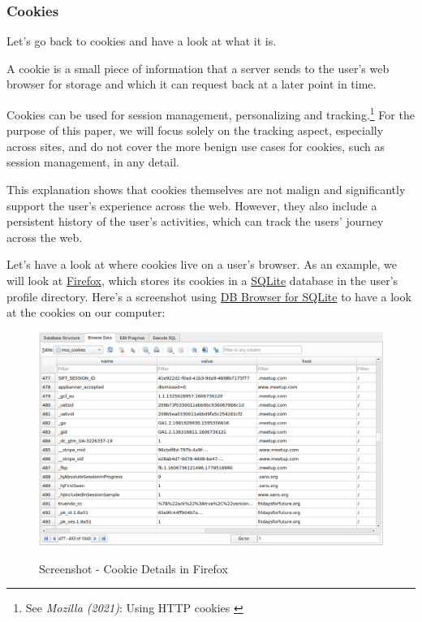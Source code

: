 \subsubsection{Cookies}

Let's go back to cookies and have a look at what it is.

A cookie is a small piece of information that a server sends to the user's web browser for storage and which it can request back at a later point in time.

Cookies can be used for session management, personalizing and tracking.\footnote{See \textit{Mozilla (2021)}: Using HTTP cookies \cite{usingCookies}} For the purpose of this paper, we will focus solely on the tracking aspect, especially across sites, and do not cover the more benign use cases for cookies, such as session management, in any detail.

This explanation shows that cookies themselves are not malign and significantly support the user's experience across the web. However, they also include a persistent history of the user's activities, which can track the users' journey across the web.

Let's have a look at where cookies live on a user's browser. As an example, we will look at \href{https://www.mozilla.org/en-US/firefox/new/}{Firefox}, which stores its cookies in a \href{https://www.sqlite.org/index.html}{SQLite} database in the user's profile directory. Here's a screenshot using \href{https://sqlitebrowser.org/}{DB Browser for SQLite} to have a look at the cookies on our computer:

\begin{figure}[H]
\centering
\caption{Screenshot - Cookie Details in Firefox}
\includegraphics[width=\linewidth]{images/cookie-sqlite.png}
\label{fig:cookies}
\end{figure}

